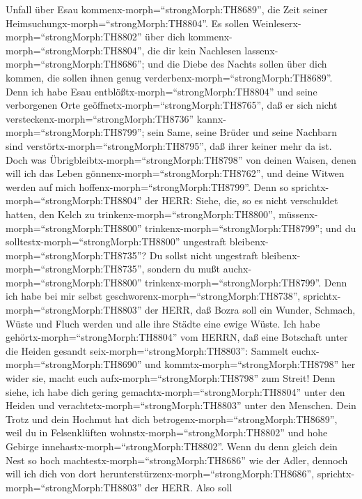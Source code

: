 Unfall über Esau kommenx-morph=``strongMorph:TH8689'', die Zeit seiner
Heimsuchungx-morph=``strongMorph:TH8804''.  Es sollen
Weinleserx-morph=``strongMorph:TH8802'' über dich
kommenx-morph=``strongMorph:TH8804'', die dir kein Nachlesen
lassenx-morph=``strongMorph:TH8686''; und die Diebe des Nachts sollen
über dich kommen, die sollen ihnen genug
verderbenx-morph=``strongMorph:TH8689''.  Denn ich habe
Esau entblößtx-morph=``strongMorph:TH8804'' und seine verborgenen Orte
geöffnetx-morph=``strongMorph:TH8765'', daß er sich nicht
versteckenx-morph=``strongMorph:TH8736''
kannx-morph=``strongMorph:TH8799''; sein Same, seine Brüder und seine
Nachbarn sind verstörtx-morph=``strongMorph:TH8795'', daß ihrer keiner
mehr da ist.  Doch was
Übrigbleibtx-morph=``strongMorph:TH8798'' von deinen Waisen, denen will
ich das Leben gönnenx-morph=``strongMorph:TH8762'', und deine Witwen
werden auf mich hoffenx-morph=``strongMorph:TH8799''.  Denn
so sprichtx-morph=``strongMorph:TH8804'' der HERR: Siehe, die, so es
nicht verschuldet hatten, den Kelch zu
trinkenx-morph=``strongMorph:TH8800'',
müssenx-morph=``strongMorph:TH8800''
trinkenx-morph=``strongMorph:TH8799''; und du
solltestx-morph=``strongMorph:TH8800'' ungestraft
bleibenx-morph=``strongMorph:TH8735''? Du sollst nicht ungestraft
bleibenx-morph=``strongMorph:TH8735'', sondern du mußt
auchx-morph=``strongMorph:TH8800''
trinkenx-morph=``strongMorph:TH8799''.  Denn ich habe bei
mir selbst geschworenx-morph=``strongMorph:TH8738'',
sprichtx-morph=``strongMorph:TH8803'' der HERR, daß Bozra soll ein
Wunder, Schmach, Wüste und Fluch werden und alle ihre Städte eine ewige
Wüste.  Ich habe gehörtx-morph=``strongMorph:TH8804'' vom
HERRN, daß eine Botschaft unter die Heiden gesandt
seix-morph=``strongMorph:TH8803'': Sammelt
euchx-morph=``strongMorph:TH8690'' und
kommtx-morph=``strongMorph:TH8798'' her wider sie, macht euch
aufx-morph=``strongMorph:TH8798'' zum Streit!  Denn siehe,
ich habe dich gering gemachtx-morph=``strongMorph:TH8804'' unter den
Heiden und verachtetx-morph=``strongMorph:TH8803'' unter den Menschen.
 Dein Trotz und dein Hochmut hat dich
betrogenx-morph=``strongMorph:TH8689'', weil du in Felsenklüften
wohnstx-morph=``strongMorph:TH8802'' und hohe Gebirge
innehastx-morph=``strongMorph:TH8802''. Wenn du denn gleich dein Nest so
hoch machtestx-morph=``strongMorph:TH8686'' wie der Adler, dennoch will
ich dich von dort herunterstürzenx-morph=``strongMorph:TH8686'',
sprichtx-morph=``strongMorph:TH8803'' der HERR.  Also soll

